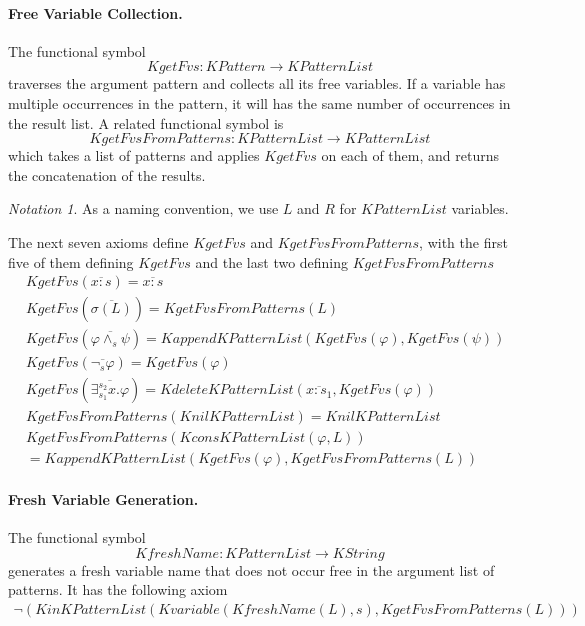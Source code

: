 \documentclass[UTF8,11pt]{article}
\newcounter{thmcounter}
\theoremstyle{plain}
\theoremstyle{definition}
\theoremstyle{remark}
\newtheorem{notation}   [thmcounter]{Notation}
\newcommand{\cln}{{:}}
\newcommand{\KString}{\mathit{KString}}
\newcommand{\KPatternList}{\mathit{KPatternList}}
\newcommand{\KnilKPatternList}{\mathit{KnilKPatternList}}
\newcommand{\KconsKPatternList}{\mathit{KconsKPatternList}}
\newcommand{\KappendKPatternList}{\mathit{KappendKPatternList}}
\newcommand{\KinKPatternList}{\mathit{KinKPatternList}}
\newcommand{\KdeleteKPatternList}{\mathit{KdeleteKPatternList}}
\newcommand{\KPattern}{\mathit{KPattern}}
\newcommand{\Kvariable}{\mathit{Kvariable}}
\newcommand{\KgetFvs}{\mathit{KgetFvs}}
\newcommand{\KgetFvsFromPatterns}{\mathit{KgetFvsFromPatterns}}
\newcommand{\KfreshName}{\mathit{KfreshName}}
\begin{document}
\paragraph{Free Variable Collection.}
The functional symbol 
$$\KgetFvs \colon \KPattern \to \KPatternList$$
traverses the argument pattern and collects all its free variables.
If a variable has multiple occurrences in the pattern, it will has the same number of occurrences in the result list.
A related functional symbol is 
$$ \KgetFvsFromPatterns \colon \KPatternList \to \KPatternList $$
which takes a list of patterns and applies $\KgetFvs$ on each of them, and returns the concatenation of the results.
\begin{notation}
	As a naming convention, we use $L$ and $R$ for $\KPatternList$ variables. 
\end{notation}
The next seven axioms define $\KgetFvs$ and $\KgetFvsFromPatterns$, with the first five of them defining $\KgetFvs$ and the last two defining $\KgetFvsFromPatterns$
\begin{align*}
& \KgetFvs(\overline{x \cln s}) = \overline{x \cln s}
\\
& \KgetFvs(\overline{\sigma(L)}) = \KgetFvsFromPatterns(L)
\\
& \KgetFvs(\overline{\varphi \wedge_s \psi}) = \KappendKPatternList(\KgetFvs(\varphi), \KgetFvs(\psi))
\\
& \KgetFvs(\overline{\neg_s \varphi}) = \KgetFvs(\varphi)
\\
& \KgetFvs(\overline{\exists_{s_1}^{s_2} x . \varphi}) = \KdeleteKPatternList(\overline{x \cln s_1}, \KgetFvs(\varphi))
\\
& \KgetFvsFromPatterns(\KnilKPatternList) = \KnilKPatternList
\\
& \KgetFvsFromPatterns(\KconsKPatternList(\varphi, L))
\\
& = \KappendKPatternList(\KgetFvs(\varphi), \KgetFvsFromPatterns(L))
\end{align*}

\paragraph{Fresh Variable Generation.}
The functional symbol
$$\KfreshName \colon \KPatternList \to \KString$$ 
generates a fresh variable name that does not occur free in the argument list of patterns.
It has the following axiom
\begin{align*}
\neg(\KinKPatternList(\Kvariable(\KfreshName(L), s), \KgetFvsFromPatterns(L)))
\end{align*}
\end{document}
